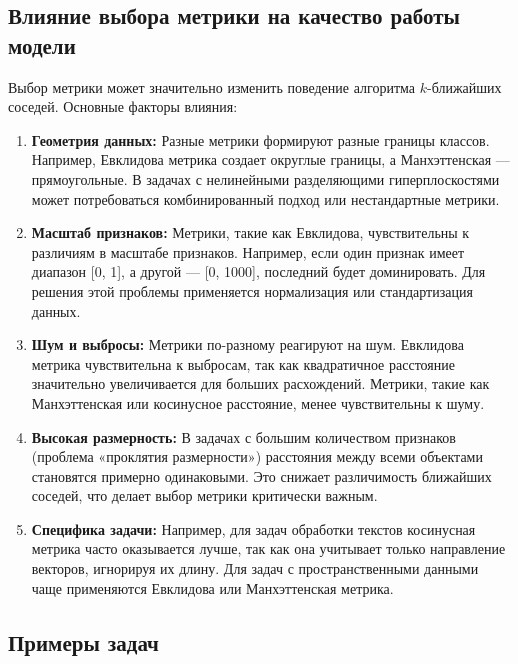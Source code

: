 \subsection{Влияние выбора метрики на качество работы модели}

Выбор метрики может значительно изменить поведение алгоритма \(k\)-ближайших соседей. Основные факторы влияния:

\begin{enumerate}
    \item \textbf{Геометрия данных:}  
    Разные метрики формируют разные границы классов. Например, Евклидова метрика создает округлые границы, а Манхэттенская — прямоугольные. В задачах с нелинейными разделяющими гиперплоскостями может потребоваться комбинированный подход или нестандартные метрики.

    \item \textbf{Масштаб признаков:}  
    Метрики, такие как Евклидова, чувствительны к различиям в масштабе признаков. Например, если один признак имеет диапазон [0, 1], а другой — [0, 1000], последний будет доминировать. Для решения этой проблемы применяется нормализация или стандартизация данных.

    \item \textbf{Шум и выбросы:}  
    Метрики по-разному реагируют на шум. Евклидова метрика чувствительна к выбросам, так как квадратичное расстояние значительно увеличивается для больших расхождений. Метрики, такие как Манхэттенская или косинусное расстояние, менее чувствительны к шуму.

    \item \textbf{Высокая размерность:}  
    В задачах с большим количеством признаков (проблема «проклятия размерности») расстояния между всеми объектами становятся примерно одинаковыми. Это снижает различимость ближайших соседей, что делает выбор метрики критически важным.

    \item \textbf{Специфика задачи:}  
    Например, для задач обработки текстов косинусная метрика часто оказывается лучше, так как она учитывает только направление векторов, игнорируя их длину. Для задач с пространственными данными чаще применяются Евклидова или Манхэттенская метрика.
\end{enumerate}

\subsection{Примеры задач}

